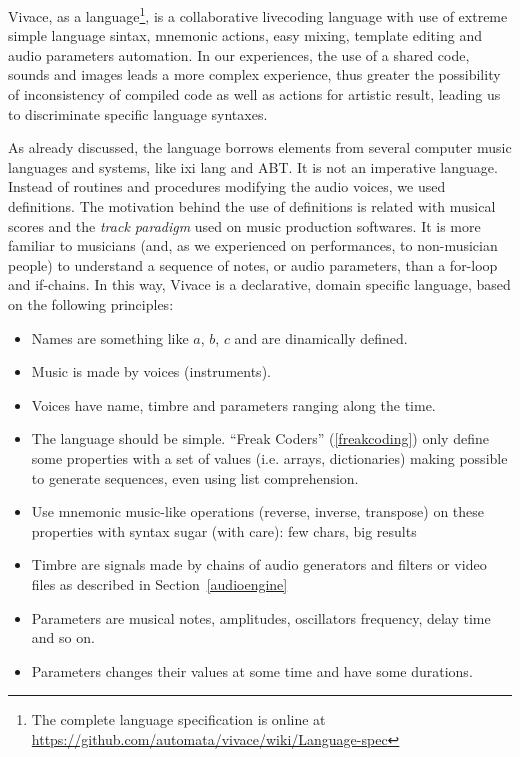 \documentclass[letterpaper, 12pt]{article}
\begin{document}
Vivace, as a language\footnote{The complete language specification is
  online at
  \url{https://github.com/automata/vivace/wiki/Language-spec}}, is a
collaborative livecoding language with use of extreme simple language
sintax, mnemonic actions, easy mixing, template editing and audio
parameters automation. In our experiences, the use of a shared code,
sounds and images leads a more complex experience, thus greater the
possibility of inconsistency of compiled code as well as actions for
artistic result, leading us to discriminate specific language
syntaxes.  

As already discussed, the language borrows elements from several
computer music languages and systems, like ixi lang and ABT. It is not
an imperative language. Instead of routines and procedures modifying
the audio voices, we used definitions. The motivation behind the use
of definitions is related with musical scores and the \emph{track
  paradigm} used on music production softwares. It is more familiar to
musicians (and, as we experienced on performances, to non-musician
people) to understand a sequence of notes, or audio parameters, than a
for-loop and if-chains. In this way, Vivace is a declarative, domain
specific language, based on the following principles:

\begin{itemize}
  
\item Names are something like $a$, $b$, $c$ and are dinamically defined.
\item Music is made by voices (instruments).
\item Voices have name, timbre and parameters ranging along the
  time.  \item The language should be simple. ``Freak Coders''
  (\ref{freakcoding}) only define some properties with a set of values
  (i.e. arrays, dictionaries) making possible to generate sequences,
  even using list comprehension.
\item Use mnemonic music-like operations (reverse, inverse, transpose)
  on these properties with syntax sugar (with care): few chars, big
  results
\item Timbre are signals made by chains of audio generators and
  filters or video files as described in Section~\ref{audioengine}
\item Parameters are musical notes, amplitudes, oscillators frequency,
  delay time and so on.
\item Parameters changes their values at some time and have some
  durations.

\end{itemize}
\end{document}
